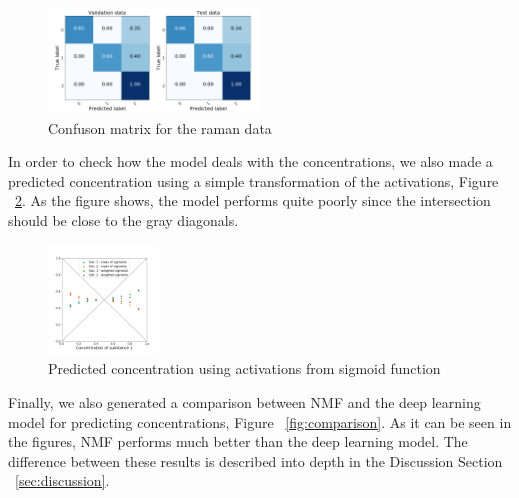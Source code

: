 \documentclass{article}
\begin{document}
\begin{figure}[H]
  \centering
  \includegraphics[width=0.5\textwidth]{raman_sim_3_conf_matrix13_2.png}
  \caption{Confuson matrix for the raman data}
  \label{fig:confusion}
\end{figure}
%
In order to check how the model deals with the concentrations, we also made a predicted concentration using a simple transformation of the activations, Figure ~\ref{fig:conc_sigmoids}. As the figure shows, the model performs quite poorly since the intersection should be close to the gray diagonals. %
\begin{figure}[H]
	\centering
	\includegraphics[width=0.26\textwidth]{DNN_pred_conc_sigmoid_2.png} 
	\caption{Predicted concentration using activations from sigmoid function}
	\label{fig:conc_sigmoids}
\end{figure}
%
Finally, we also generated a comparison between NMF and the deep learning model for predicting concentrations, Figure ~\ref{fig:comparison}. As it can be seen in the figures, NMF performs much better than the deep learning model. The difference between these results is described into depth in the Discussion Section ~\ref{sec:discussion}.
\end{document}
